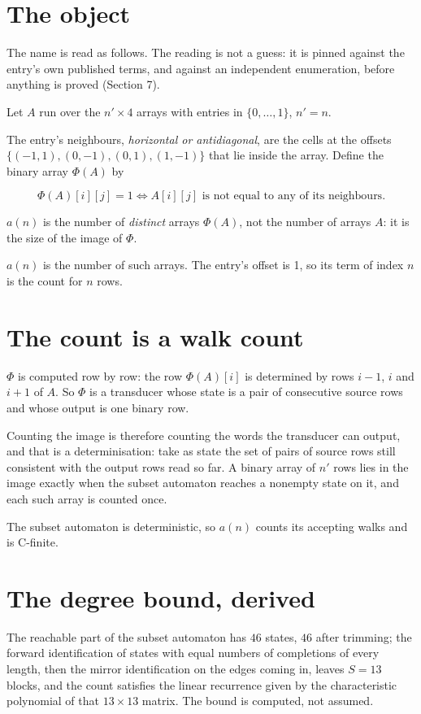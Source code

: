 \documentclass[11pt]{article}
\theoremstyle{definition}
\begin{document}
\section{The object}

The name is read as follows. The reading is not a guess: it is pinned against the entry's own published terms, and against an independent enumeration, before anything is proved (Section 7).

Let $A$ run over the $n' \times 4$ arrays with entries in $\{0,\dots,1\}$, $n' = n$.

The entry's neighbours, {\itshape horizontal or antidiagonal}, are the cells at the offsets $\{(-1,1), (0,-1), (0,1), (1,-1)\}$ that lie inside the array. Define the binary array $\Phi(A)$ by

\[\Phi(A)[i][j] = 1 \iff A[i][j] \text{ is not equal to any of its neighbours}.\]

$a(n)$ is the number of {\itshape distinct} arrays $\Phi(A)$, not the number of arrays $A$: it is the size of the image of $\Phi$.

$a(n)$ is the number of such arrays. The entry's offset is 1, so its term of index $n$ is the count for $n$ rows.

\section{The count is a walk count}

$\Phi$ is computed row by row: the row $\Phi(A)[i]$ is determined by rows $i-1$, $i$ and $i+1$ of $A$. So $\Phi$ is a transducer whose state is a pair of consecutive source rows and whose output is one binary row.

Counting the image is therefore counting the words the transducer can output, and that is a determinisation: take as state the set of pairs of source rows still consistent with the output rows read so far. A binary array of $n'$ rows lies in the image exactly when the subset automaton reaches a nonempty state on it, and each such array is counted once.

The subset automaton is deterministic, so $a(n)$ counts its accepting walks and is C-finite.

\section{The degree bound, derived}

The reachable part of the subset automaton has $46$ states, $46$ after trimming; the forward identification of states with equal numbers of completions of every length, then the mirror identification on the edges coming in, leaves $S = 13$ blocks, and the count satisfies the linear recurrence given by the characteristic polynomial of that $13\times13$ matrix. The bound is computed, not assumed.
\end{document}
